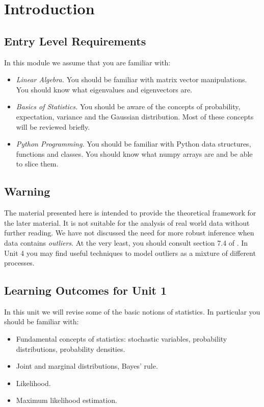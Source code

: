 
\chapter{Introduction}

\section{Entry Level Requirements}
In this module we assume that you are familiar with:
\begin{itemize}
\item \emph{Linear Algebra.} You should be familiar with matrix vector manipulations.
  You should know what eigenvalues and eigenvectors are.
\item \emph{Basics of Statistics.} You should be aware of the concepts of probability,
  expectation, variance and the Gaussian distribution. Most of these concepts will
  be reviewed briefly.
\item \emph{Python Programming.} You should be familiar with Python data structures,
  functions and classes. You should know what numpy arrays are and be able to slice
  them.
\end{itemize}  

\section{Warning}
The material presented here is intended to provide the theoretical framework
for the later material. It is not suitable for the analysis of real world data without
further reading. We have not discussed the need for more robust inference
when data contains \emph{outliers}. At the very least, you should consult
section 7.4 of \cite{murphy2012}. In Unit 4 you may find useful techniques
to model outliers as a mixture of different processes.

  
\section{Learning Outcomes for Unit 1}
In this unit we will revise some of the basic notions of statistics. In particular
you should be  familiar with:

\begin{itemize}
\item Fundamental concepts of statistics: stochastic variables,
  probability distributions, probability densities.

\item Joint and marginal distributions, Bayes' rule.
\item Likelihood.
\item Maximum likelihood estimation.
\end{itemize}

